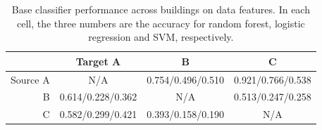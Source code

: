 \begin{table}[]
\centering
\begin{tabular}{r|c|c|c}
\hline
 & Target A     & B     & C     \\ \hline\hline
Source A & N/A   & 0.754/0.496/0.510 & 0.921/0.766/0.538 \\ \hline
B & 0.614/0.228/0.362 & N/A   & 0.513/0.247/0.258 \\ \hline
C & 0.582/0.299/0.421 & 0.393/0.158/0.190 & N/A   \\ \hline
\end{tabular}
\caption{Base classifier performance across buildings on data features. In each cell, the three numbers are the accuracy for random forest, logistic regression and SVM, respectively.}
\label{acc_base}
\end{table}


